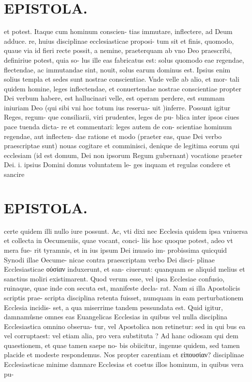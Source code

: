\documentclass{article}
\begin{document}
\begin{pages}
\section*{EPISTOLA. }et potest. Itaque cum hominum conscien- tias immutare, inflectere, ad Deum adduce. re, huius disciplinae ecclesiasticae proposi- tum sit et finis, quomodo, quaue via id fieri recte possit, a nemine, praeterquam ab vno Deo praescribi, definiriue potest, quia so- lus ille eas fabricatus est: solus quomodo eae regendae, flectendae, ac immutandae sint, nouit, solus earum dominus est. Ipsius enim solius templa et sedes sunt nostrae conscientiae. Vnde velle ab alio, et mor- tali quidem homine, leges inflectendae, et conuertendae nostrae conscientiae propter Dei verbum habere, est hallucinari velle, est operam perdere, est summam iniuriam Deo (qui sibi vni hoc totum ius reserua- uit )inferre. Possunt igitur Reges, regum- que consiliarii, viri prudentes, leges de pu- blica inter ipsos ciues pace tuenda dicta- re et commentari: leges autem de con- scientiae hominum regendae, aut inflecten- dae ratione et modo (praeter eas, quae Dei verbo praescriptae sunt) nouas cogitare et comminisci, denique de legitima eorum qui ecclesiam (id est domum, Dei non ipsorum Regum gubernant) vocatione praeter Dei. i. ipsius Domini domus voluntatem le- ges inquam et regulas condere et sancire 
\section*{EPISTOLA. }certe quidem illi nullo iure possunt. Ac, vti dixi nec Ecclesia quidem ipsa vniuersa et collecta in Oecumeniis, quae vocant, conci- liis hoc quoque potest, adeo vt mera fue- rit tyramnis, et in ius ipsum Dei inuasio im- probissima quicquid Synodi illae Oecume- nicae contra praescriptam verbo Dei disci- plinae Ecclesiasticae οὐσίαν induxerunt, et san- ciuerunt: quanquam se aliquid melius et sanctius moliri existimarent. Quod verum esse, vel ipsa Ecclesiae confusio, ruinaque, quae inde con secuta est, manifeste decla- rat. Nam si illa Apostolicis scriptis prae- scripta disciplina retenta fuisset, numquam in eam perturbationem Ecclesia incidis- set, a qua miserrime tandem pessundata est. Quid igitur, damnamûsne omnes eas Euangelicas Ecclesias in quibus vel nulla disciplina Ecclesiastica omnino obserua- tur, vel Apostolica non retinetur: sed in qui bus ea vel corruptaest: vel etiam alia, pro vera substituta ? Ad hanc odiosam qui dem quaestionem, et quae tamen saepe no- bis obiicitur, ingenue quidem, sed tamen placide et modeste respondemus. Nos propter carentiam et εἰπουσίαν? disciplinae Ecclesiasticae minime damnare Ecclesias et coetus illos hominum, in quibus vera pu- 

\end{pages}
\end{document}
